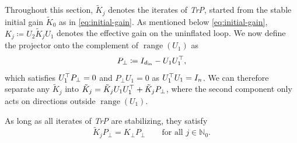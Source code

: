 Throughout this section, $\tilde{K}_j$ denotes the iterates of \emph{TrP},
started from the stable initial gain $\tilde{K}_0$ as in \eqref{eq:initial-gain}. As mentioned below \eqref{eq:initial-gain}, $K_j \coloneqq U_2 \tilde{K}_j U_1$
denotes the effective gain on the uninflated loop. We now define the projector onto the complement of $\operatorname{range}(U_1)$ as
\begin{equation}
    \label{eq:app-projector}
    P_{\perp} \coloneqq I_{d_{\mathrm{in}}} - U_1 U_1^{\top} ,
\end{equation}
which satisfies $U_1^{\top} P_{\perp} = 0$ and $P_{\perp} U_1 = 0$ as $U_1^{\top} U_1 = I_n$. We can therefore
separate any $\tilde{K}_j$ into $\tilde{K}_j = \tilde{K}_j U_1 U_1^{\top} + \tilde{K}_j P_{\perp}$, where the second component only acts on
directions outside $\operatorname{range}(U_1)$.
\begin{lemma}
\label{thm:app-trp-invisible-gain}
As long as all iterates of \emph{TrP} are stabilizing, they satisfy
\begin{equation*}
    \tilde{K}_j P_{\perp} = K_{\perp} P_{\perp} \qquad \text{for all } j \in \mathbb{N}_0 .
\end{equation*}
\end{lemma}
